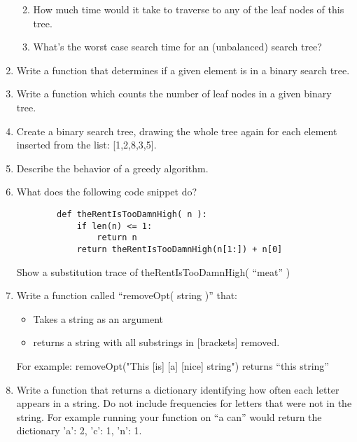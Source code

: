 \documentclass[11pt]{article}
\begin{document}
\begin{enumerate}
\begin{enumerate}
                \vspace{.25in}
            \item How much time would it take to traverse to any of the leaf
            nodes of this tree.
                \vspace{.25in}
            \item What's the worst case search time for an (unbalanced) search
            tree?
                \pagebreak
        \end{enumerate}
    \item Write a function that determines if a given element is in a binary search tree.
        \vspace{3in}
    \item Write a function which counts the number of leaf nodes in a given binary tree.
        \pagebreak
    \item Create a binary search tree, drawing the whole tree
        again for each element inserted from the list: [1,2,8,3,5].
        \vspace{6in}
    \item Describe the behavior of a greedy algorithm.
        \pagebreak

    \item What does the following code snippet do?
        \begin{verbatim}
        def theRentIsTooDamnHigh( n ):
            if len(n) <= 1:
                return n
            return theRentIsTooDamnHigh(n[1:]) + n[0]
        \end{verbatim}
            \vspace{1in}
        Show a substitution trace of theRentIsTooDamnHigh( ``meat'' )
            \vspace{2in}
    \item Write a function called ``removeOpt( string )'' that:
        \begin{itemize}
            \item Takes a string as an argument
            \item returns a string with all substrings in [brackets] removed.
        \end{itemize}
        For example:    
            removeOpt("This [is] [a] [nice] string")
            returns ``this   string'' 
        \pagebreak
    
    \item Write a function that returns a dictionary identifying how often each
    letter appears in a string. Do not include frequencies for letters that
    were not in the string. For example running your function on ``a can''
    would return the dictionary {'a': 2, 'c': 1, 'n': 1}.
        \vspace{3in}
    

\end{enumerate}
\end{document}

